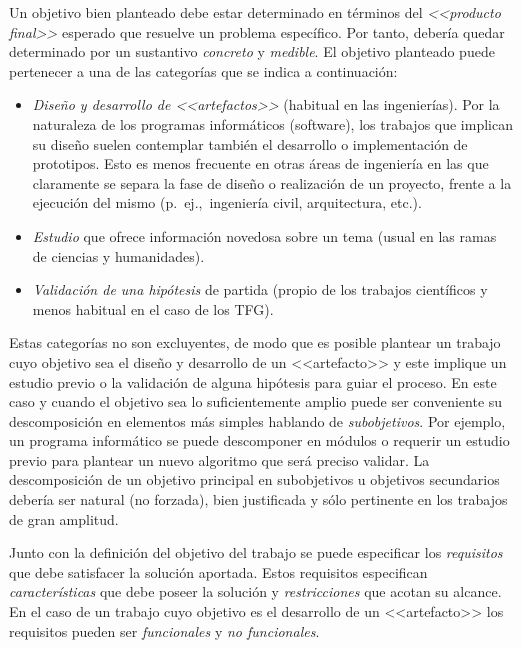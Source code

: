Un objetivo bien planteado debe estar determinado en términos del \emph{<<producto final>>} esperado que resuelve un problema específico. Por tanto, debería quedar determinado por un sustantivo \emph{concreto} y \emph{medible}. El objetivo planteado puede pertenecer a una de las categorías que se indica a continuación:
\begin{itemize}
	\item \emph{Diseño y desarrollo de <<artefactos>>}
	(habitual en las ingenierías). Por la naturaleza de los programas informáticos (software), los trabajos que implican su diseño suelen contemplar también el desarrollo o implementación de prototipos. Esto es menos frecuente en otras áreas de ingeniería en las que claramente se separa la fase de diseño o realización de un proyecto, frente a la ejecución del mismo (p.~ej.,~ingeniería civil, arquitectura, etc.). 
    
	\item \emph{Estudio} que ofrece información novedosa sobre un tema (usual en las ramas de ciencias y humanidades). 
    
	\item \emph{Validación de una 
	hipótesis} de partida (propio de los trabajos 
	científicos y menos habitual en el caso de los TFG).
\end{itemize}

Estas categorías no son excluyentes, de modo que es posible plantear un trabajo cuyo objetivo sea el diseño y desarrollo de un <<artefacto>> y este implique un estudio previo o la validación de alguna hipótesis para guiar el proceso. En este caso y cuando el objetivo sea lo suficientemente amplio puede ser conveniente su descomposición en elementos más simples hablando de \emph{subobjetivos}. Por ejemplo, un programa informático se puede descomponer en módulos o requerir un estudio previo para plantear un nuevo algoritmo que será preciso validar. La descomposición de un objetivo principal en subobjetivos 
u objetivos secundarios debería ser natural (no forzada), bien justificada y 
sólo pertinente en los trabajos de gran amplitud.

Junto con la definición del objetivo del trabajo se puede especificar los \emph{requisitos} que debe satisfacer la solución aportada. Estos requisitos especifican \emph{características} que debe poseer la solución y \emph{restricciones} que acotan su alcance. En el caso de un trabajo cuyo objetivo es el desarrollo de un <<artefacto>> los requisitos pueden ser \emph{funcionales} y \emph{no funcionales}.

